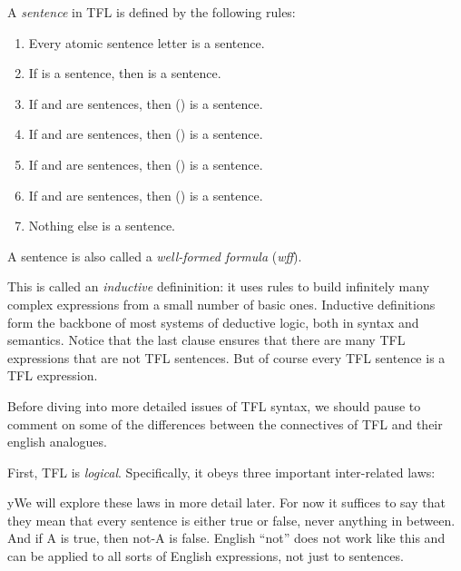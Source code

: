 \begin{definition}
  \label{def:tfl-sentence}
  A \emph{sentence} in TFL is defined by the following rules:
  \begin{enumerate}
  \item Every atomic sentence letter is a sentence.
  \item If \sphi is a sentence, then \enot\sphi is a sentence.
  \item If \sphi and \spsi are sentences, then (\ephi\eand\epsi) is a sentence.
  \item If \sphi and \spsi are sentences, then (\ephi\eor\epsi) is a sentence.
  \item If \sphi and \spsi are sentences, then (\ephi\eif\epsi) is a sentence.
  \item If \sphi and \spsi are sentences, then (\ephi\eiff\epsi) is a sentence.
  \item Nothing else is a sentence.
  \end{enumerate}
  A sentence is also called a \emph{well-formed formula} (\emph{wff}).
\end{definition}

This is called an \emph{inductive} defininition: it uses rules to build
infinitely many complex expressions from a small number of basic ones. Inductive
definitions form the backbone of most systems of deductive logic, both in syntax
and semantics. Notice that the last clause ensures that there are many TFL
expressions that are not TFL sentences. But of course every TFL sentence is a
TFL expression.

Before diving into more detailed issues of TFL syntax, we should pause to
comment on some of the differences between the connectives of TFL and their
english analogues.

First, TFL \snot is \emph{logical}. Specifically, it obeys three important
inter-related laws:


yWe will explore these laws in more detail later. For now it suffices to say that
they mean that every sentence is either true or false, never anything in
between. And if A is true, then not-A is false. English ``not'' does not work
like this and can be applied to all sorts of English expressions, not just to
sentences.

